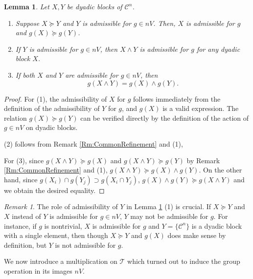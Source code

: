 \documentclass[12pt,reqno]{amsart}
\theoremstyle{plain}
\newtheorem{lemma}[theorem]{Lemma}
\theoremstyle{definition}
\theoremstyle{remark}
\newtheorem{remark}{Remark}[section]
\numberwithin{equation}{section}
\begin{document}
\begin{lemma}\label{Lem:Admissibility}  
	Let  $X, Y$  be dyadic blocks of  $\mathcal{C}^n$.  
	\begin{enumerate} 
	\item 
		Suppose  $X \succeq Y$  and  $Y$  is admissible for  $g \in nV$.    
		Then,  
		$X$  is admissible for  $g$  and  $g(X) \succeq g(Y)$.  
	\item 
		If  $Y$  is admissible for  $g \in nV$,  
		then  $X \wedge Y$  is admissible for  $g$  for any dyadic block  $X$.
	\item 	
		If both  $X$  and  $Y$  are admissible for  $g \in nV$, 
		then  
		\begin{equation*} 
			g(X \wedge Y) = g(X) \wedge g(Y). 
		\end{equation*}   
	\end{enumerate} 
\end{lemma} 
\begin{proof} 
	For (1), 
	the admissibility of  $X$  for  $g$  follows immediately from the definition of 
	the admissibility of  $Y$  for  $g$, 
	and  $g(X)$  is a valid expression.  
	The relation  $g(X) \succeq g(Y)$  can be verified directly by the definition 
	of the action of  $g \in nV$  on dyadic blocks.   

	(2)  follows from Remark \ref{Rm:CommonRefinement} and  (1), 

	For (3),  
	since  $g(X \wedge Y) \succeq  g(X)$  and 
	$g(X \wedge Y) \succeq  g(Y)$  by Remark \ref{Rm:CommonRefinement} and (1),  
	$g(X \wedge Y) \succeq g(X) \wedge g(Y)$.  
	On the other hand, 
	since  $g(X_i) \cap g(Y_j) \supset g(X_i \cap Y_j)$, 
	$g(X) \wedge g(Y) \succeq g(X \wedge Y)$  
	and we obtain the desired equality.   
\end{proof} 

\begin{remark} 
	The role of admissibility of  $Y$  in Lemma \ref{Lem:Admissibility} (1)  is crucial.  
	If  $X \succeq Y$  and  $X$  instead of  $Y$  is admissible for  $g \in nV$,    
	$Y$  may not be admissible for  $g$.  	
	For instance, 
	if  $g$  is nontrivial, 
	$X$  is admissible for  $g$  and  $Y = \{ \mathcal{C}^n \}$  is a dyadic block with a single element,   
	then though  $X \succeq Y$  and  $g(X)$  does make sense by definition, but	  
	$Y$  is not admissible for  $g$.  
\end{remark} 

We now introduce a multiplication on  $\mathcal{T}$ which 
turned out to induce the group operation in its images $nV$.
\end{document}
